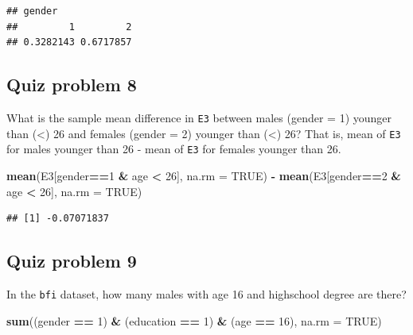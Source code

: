 \documentclass[]{book}
\newenvironment{Shaded}{\begin{snugshade}}{\end{snugshade}}
\newcommand{\DataTypeTok}[1]{\textcolor[rgb]{0.13,0.29,0.53}{#1}}
\newcommand{\DecValTok}[1]{\textcolor[rgb]{0.00,0.00,0.81}{#1}}
\newcommand{\KeywordTok}[1]{\textcolor[rgb]{0.13,0.29,0.53}{\textbf{#1}}}
\newcommand{\NormalTok}[1]{#1}
\newcommand{\OperatorTok}[1]{\textcolor[rgb]{0.81,0.36,0.00}{\textbf{#1}}}
\newcommand{\OtherTok}[1]{\textcolor[rgb]{0.56,0.35,0.01}{#1}}
\newcommand{\StringTok}[1]{\textcolor[rgb]{0.31,0.60,0.02}{#1}}
\begin{document}
\begin{verbatim}
## gender
##         1         2 
## 0.3282143 0.6717857
\end{verbatim}

\hypertarget{quiz-problem-8}{%
\subsection{Quiz problem 8}\label{quiz-problem-8}}

What is the sample mean difference in \texttt{E3} between males (gender = 1) younger than (\textless{}) 26 and females (gender = 2) younger than (\textless{}) 26? That is, mean of \texttt{E3} for males younger than 26 - mean of \texttt{E3} for females younger than 26.

\begin{Shaded}
\begin{Highlighting}[]
\KeywordTok{mean}\NormalTok{(E3[gender}\OperatorTok{==}\DecValTok{1} \OperatorTok{&}\StringTok{ }\NormalTok{age }\OperatorTok{<}\StringTok{ }\DecValTok{26}\NormalTok{], }\DataTypeTok{na.rm =} \OtherTok{TRUE}\NormalTok{) }\OperatorTok{-}\StringTok{ }\KeywordTok{mean}\NormalTok{(E3[gender}\OperatorTok{==}\DecValTok{2} \OperatorTok{&}\StringTok{ }\NormalTok{age }\OperatorTok{<}\StringTok{ }\DecValTok{26}\NormalTok{], }\DataTypeTok{na.rm =} \OtherTok{TRUE}\NormalTok{)}
\end{Highlighting}
\end{Shaded}

\begin{verbatim}
## [1] -0.07071837
\end{verbatim}

\hypertarget{quiz-problem-9}{%
\subsection{Quiz problem 9}\label{quiz-problem-9}}

In the \texttt{bfi} dataset, how many males with age 16 and highschool degree are there?

\begin{Shaded}
\begin{Highlighting}[]
\KeywordTok{sum}\NormalTok{((gender }\OperatorTok{==}\StringTok{ }\DecValTok{1}\NormalTok{) }\OperatorTok{&}\StringTok{ }\NormalTok{(education }\OperatorTok{==}\StringTok{ }\DecValTok{1}\NormalTok{) }\OperatorTok{&}\StringTok{ }\NormalTok{(age }\OperatorTok{==}\StringTok{ }\DecValTok{16}\NormalTok{), }\DataTypeTok{na.rm =} \OtherTok{TRUE}\NormalTok{)}
\end{Highlighting}
\end{Shaded}
\end{document}
